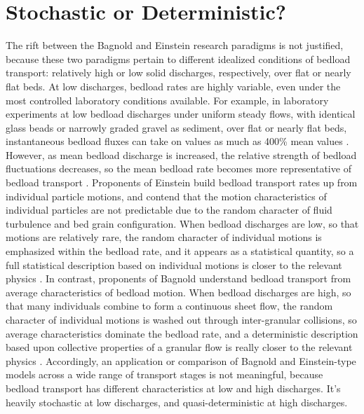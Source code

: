 \documentclass{article}
\begin{document}
\section{Stochastic or Deterministic?}


The rift between the Bagnold and Einstein research paradigms is not justified, because these two paradigms pertain to different idealized conditions of bedload transport: relatively high or low solid discharges, respectively, over flat or nearly flat beds.
At low discharges, bedload rates are highly variable, even under the most controlled laboratory conditions available. 
For example, in laboratory experiments at low bedload discharges under uniform steady flows, with identical glass beads or narrowly graded gravel as sediment, over flat or nearly flat beds, instantaneous bedload fluxes can take on values as much as 400\% mean values \citep{Bohm2004, Ancey2008, Heyman2016}. 
However, as mean bedload discharge is increased, the relative strength of bedload fluctuations decreases, so the mean bedload rate becomes more representative of bedload transport \citep{Ancey2008}. 
Proponents of Einstein build bedload transport rates up from individual particle motions, and contend that the motion characteristics of individual particles are not predictable due to the random character of fluid turbulence and bed grain configuration. 
When bedload discharges are low, so that motions are relatively rare, the random character of individual motions is emphasized within the bedload rate, and it appears as a statistical quantity, so a full statistical description based on individual motions is closer to the relevant physics \citep{Ancey2008, Heyman2013, Ma2014, Heyman2016}.
In contrast, proponents of Bagnold understand bedload transport from average characteristics of bedload motion. 
When bedload discharges are high, so that many individuals combine to form a continuous sheet flow, the random character of individual motions is washed out through inter-granular collisions, so average characteristics dominate the bedload rate, and a deterministic description based upon collective properties of a granular flow is really closer to the relevant physics \citep{Jenkins1998, Hsu2004, Mouilleron2009, Frey2011, Houssais2016, Maurin2018}.
Accordingly, an application or comparison of Bagnold and Einstein-type models across a wide range of transport stages is not meaningful, because bedload transport has different characteristics at low and high discharges. 
It's heavily stochastic at low discharges, and quasi-deterministic at high discharges. 
\end{document}
